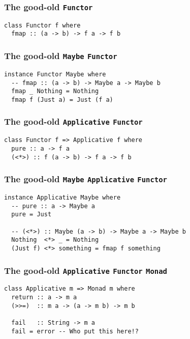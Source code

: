 \begin{frame}[fragile]

\frametitle{The good-old \texttt{Functor}}

\begin{lstlisting}
class Functor f where
  fmap :: (a -> b) -> f a -> f b
\end{lstlisting}

\end{frame}


\begin{frame}[fragile]

\frametitle{The good-old \texttt{Maybe} \texttt{Functor}}

\begin{lstlisting}
instance Functor Maybe where
  -- fmap :: (a -> b) -> Maybe a -> Maybe b
  fmap _ Nothing = Nothing
  fmap f (Just a) = Just (f a)
\end{lstlisting}

\end{frame}


\begin{frame}[fragile]

\frametitle{The good-old \texttt{Applicative} \texttt{Functor}}

\begin{lstlisting}
class Functor f => Applicative f where
  pure :: a -> f a
  (<*>) :: f (a -> b) -> f a -> f b
\end{lstlisting}

\end{frame}


\begin{frame}[fragile]

\frametitle{The good-old \texttt{Maybe} \texttt{Applicative} \texttt{Functor}}

\begin{lstlisting}
instance Applicative Maybe where
  -- pure :: a -> Maybe a
  pure = Just

  -- (<*>) :: Maybe (a -> b) -> Maybe a -> Maybe b
  Nothing  <*> _ = Nothing
  (Just f) <*> something = fmap f something
\end{lstlisting}

\end{frame}


\begin{frame}[fragile]

\frametitle{The good-old \texttt{Applicative} \texttt{Functor} \texttt{Monad}}

\begin{lstlisting}
class Applicative m => Monad m where
  return :: a -> m a
  (>>=)  :: m a -> (a -> m b) -> m b

  fail   :: String -> m a
  fail = error -- Who put this here!?
\end{lstlisting}

\end{frame}


